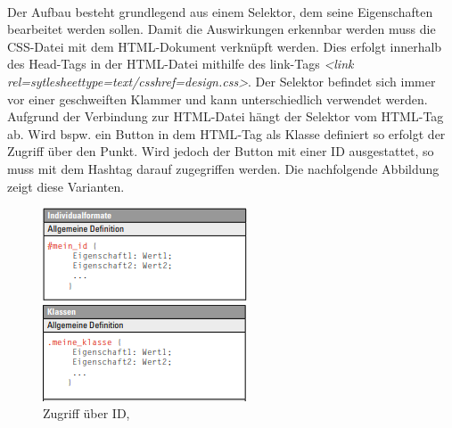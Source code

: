 \documentclass[a4paper,titlepage,halfparskip,12pt]{scrreprt}
\begin{document}
\begin{onehalfspacing}
\\Der Aufbau besteht grundlegend aus einem Selektor, dem seine Eigenschaften bearbeitet werden sollen. Damit die Auswirkungen erkennbar werden muss die \ac{CSS}-Datei mit dem HTML-Dokument verknüpft werden. Dies erfolgt innerhalb des Head-Tags in der \ac{HTML}-Datei mithilfe des link-Tags \textit{<link rel=\dq sytlesheet\dq \;type=\dq text/css\dq \;href=\dq design.css\dq>}. Der Selektor befindet sich immer vor einer geschweiften Klammer und kann unterschiedlich verwendet werden. Aufgrund der Verbindung zur HTML-Datei hängt der Selektor vom \ac{HTML}-Tag ab. Wird bspw. ein Button in dem \ac{HTML}-Tag als Klasse definiert so erfolgt der Zugriff über den Punkt. Wird jedoch der Button mit einer ID ausgestattet, so muss mit dem Hashtag darauf zugegriffen werden. Die nachfolgende Abbildung zeigt diese Varianten.
\begin{figure}[h]
	\begin{minipage}[c]{.4\textwidth}
		\includegraphics[width=\textwidth]{images/CSSID}
		\caption{Zugriff über ID, \cite{buhler2017html5}} 
		\label{img:CSSID}
	\end{minipage}
	\hspace{.1\linewidth}%
	\begin{minipage}[c]{.4\textwidth}
		\includegraphics[width=\textwidth]{images/CSSKlasse}

\end{minipage}
\end{figure}
\end{onehalfspacing}
\end{document}
